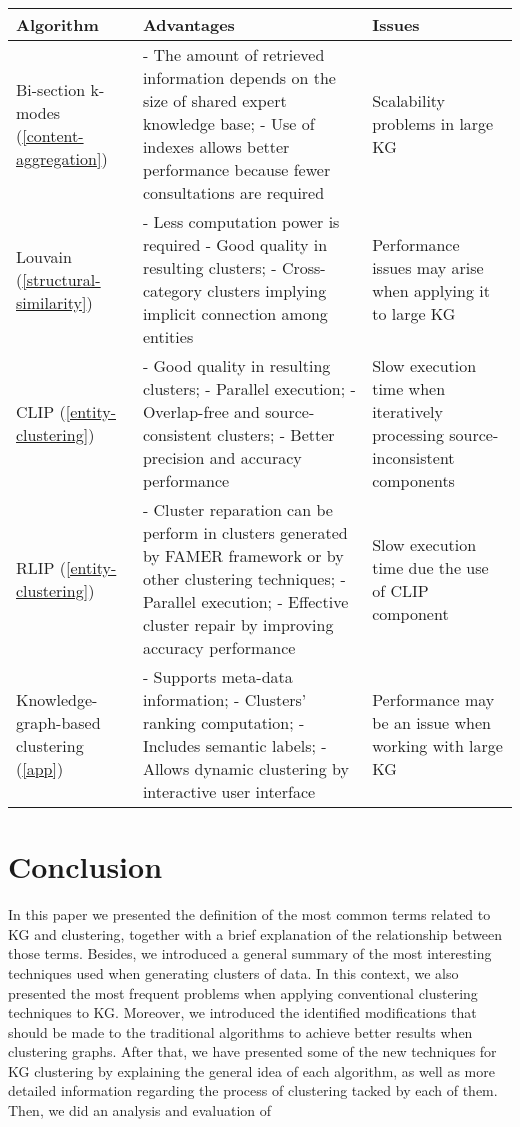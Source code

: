 \documentclass[runningheads]{llncs}
\begin{document}
 \label{table2}
\begin{tabular}{|p{3cm}|p{8.5cm}|p{3.5cm}|}
 \hline
\textbf{Algorithm} & \textbf{Advantages} & \textbf{Issues}\\
 \hline
 Bi-section k-modes (\ref{content-aggregation}) & - The amount of retrieved information depends on the size of shared expert knowledge base; - Use of indexes allows better performance because fewer consultations are required & Scalability problems in large KG \\
 \hline
 Louvain (\ref{structural-similarity}) & - Less computation power is required - Good quality in resulting clusters; - Cross-category clusters implying implicit connection among entities & Performance issues may arise when applying it to large KG \\
 \hline
 CLIP (\ref{entity-clustering}) & - Good quality in resulting clusters; - Parallel execution; - Overlap-free and source-consistent clusters; - Better precision and accuracy performance & Slow execution time when iteratively processing source-inconsistent components \\
 \hline
 RLIP (\ref{entity-clustering}) & - Cluster reparation can be perform in clusters generated by FAMER framework or by other clustering techniques; - Parallel execution; - Effective cluster repair by improving accuracy performance & Slow execution time due the use of CLIP component\\ 
 \hline
 Knowledge-graph-based clustering (\ref{app}) & - Supports meta-data information; - Clusters' ranking computation; - Includes semantic labels; - Allows dynamic clustering by interactive user interface & Performance may be an issue when working with large KG \\
 \hline
\end{tabular}

\section{Conclusion} \label{conclusion}

In this paper we presented the definition of the most common terms related to KG and clustering, together with a brief explanation of the relationship between those terms. Besides, we introduced a general summary of the most interesting techniques used when generating clusters of data.
In this context, we also presented the most frequent problems when applying conventional clustering techniques to KG. Moreover, we introduced the identified modifications that should be made to the traditional algorithms to achieve better results when clustering graphs. After that, we have presented some of the new techniques for KG clustering by explaining the general idea of each algorithm, as well as more detailed information regarding the process of clustering tacked by each of them.
Then, we did an analysis and evaluation of 
\end{document}
